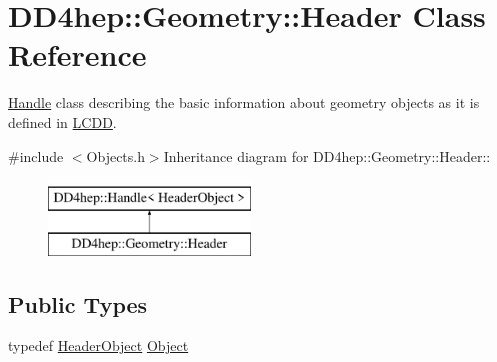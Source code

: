 \hypertarget{class_d_d4hep_1_1_geometry_1_1_header}{
\section{DD4hep::Geometry::Header Class Reference}
\label{class_d_d4hep_1_1_geometry_1_1_header}
}


\hyperlink{class_d_d4hep_1_1_handle}{Handle} class describing the basic information about geometry objects as it is defined in \hyperlink{class_d_d4hep_1_1_geometry_1_1_l_c_d_d}{LCDD}.  


{\ttfamily \#include $<$Objects.h$>$}Inheritance diagram for DD4hep::Geometry::Header::\begin{figure}[H]
\begin{center}
\leavevmode
\includegraphics[height=2cm]{class_d_d4hep_1_1_geometry_1_1_header}
\end{center}
\end{figure}
\subsection*{Public Types}
\begin{DoxyCompactItemize}
\item 
typedef \hyperlink{class_d_d4hep_1_1_geometry_1_1_header_object}{HeaderObject} \hyperlink{class_d_d4hep_1_1_geometry_1_1_header_a8cb46876d46f57257201a561bb1e0795}{Object}
\end{DoxyCompactItemize}
